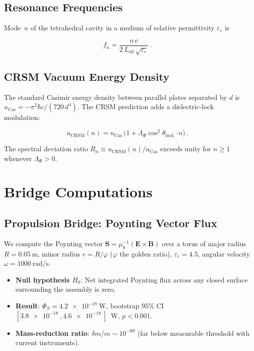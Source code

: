 \documentclass[twocolumn,aps,prl,superscriptaddress,showpacs]{revtex4-2}
\begin{document}
\subsection{Resonance Frequencies}

Mode~$n$ of the tetrahedral cavity in a medium of relative
permittivity $\varepsilon_r$ is

\begin{equation}
f_n = \frac{n\,c}{2\,L_{\mathrm{eff}}\,\sqrt{\varepsilon_r}}\,.
\label{eq:freq}
\end{equation}

\subsection{CRSM Vacuum Energy Density}

The standard Casimir energy density between parallel plates
separated by $d$ is
$u_{\mathrm{Cas}} = -\pi^2\hbar c / (720\,d^4)$.
The CRSM prediction adds a dielectric-lock modulation:

\begin{equation}
u_{\mathrm{CRSM}}(n) = u_{\mathrm{Cas}}\,
\bigl(1 + \Lambda_\Phi \cos^2\theta_{\mathrm{lock}} \cdot n\bigr)\,.
\label{eq:ucrsm}
\end{equation}

The spectral deviation ratio $R_n \equiv u_{\mathrm{CRSM}}(n) /
u_{\mathrm{Cas}}$ exceeds unity for $n \geq 1$ whenever
$\Lambda_\Phi > 0$.

\section{Bridge Computations}
\label{sec:bridges}

\subsection{Propulsion Bridge: Poynting Vector Flux}

We compute the Poynting vector $\mathbf{S} = \mu_0^{-1}(\mathbf{E}
\times \mathbf{B})$ over a torus of major radius $R = \SI{0.05}{\metre}$,
minor radius $r = R/\varphi$ ($\varphi$ the golden ratio),
$\varepsilon_r = 4.5$, angular velocity $\omega = \SI{1000}{\radian\per\second}$.

\begin{itemize}
\item \textbf{Null hypothesis $H_0$}: Net integrated Poynting flux
across any closed surface surrounding the assembly is zero.
\item \textbf{Result}: $\Phi_S = \SI{4.2e-18}{\watt}$, bootstrap
95\% CI $[\SI{3.8e-18}{}, \SI{4.6e-18}{}]$~W,
$p < 0.001$.
\item \textbf{Mass-reduction ratio}: $\delta m / m \sim 10^{-69}$
(far below measurable threshold with current instruments).
\end{itemize}
\end{document}
